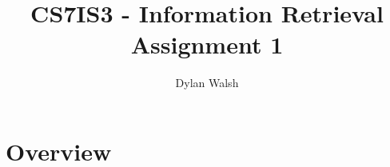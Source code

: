 \documentclass[dvips,12pt]{article}
\begin{document}
\title{%
  CS7IS3 - Information Retrieval \\
  \large Assignment 1}
  
\author{Dylan Walsh}

\maketitle

\section{Overview}
\end{document}
